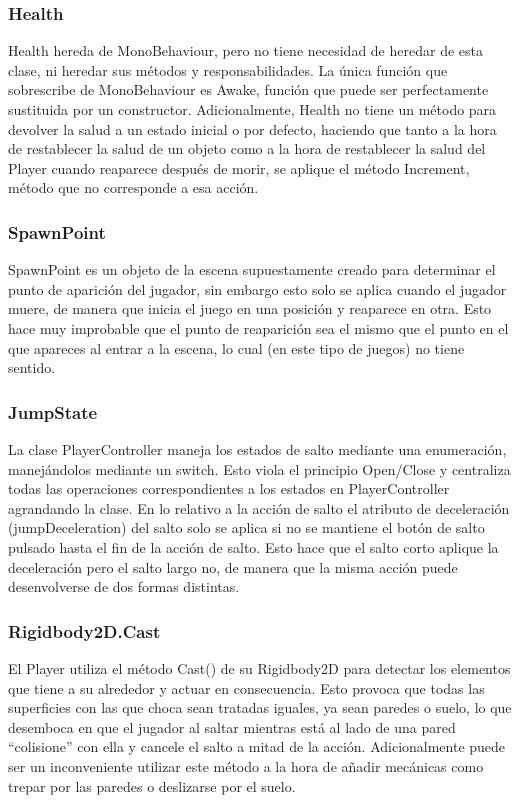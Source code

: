\subsubsection{Health}
Health hereda de MonoBehaviour, pero no tiene necesidad de heredar de esta clase, ni heredar sus métodos y responsabilidades. La única función que sobrescribe de MonoBehaviour es Awake, función que puede ser perfectamente sustituida por un constructor. Adicionalmente, Health no tiene un método para devolver la salud a un estado inicial o por defecto, haciendo que tanto a la hora de restablecer la salud de un objeto como a la hora de restablecer la salud del Player cuando reaparece después de morir, se aplique el método Increment, método que no corresponde a esa acción.

\subsubsection{SpawnPoint}
SpawnPoint es un objeto de la escena supuestamente creado para determinar el punto de aparición del jugador, sin embargo esto solo se aplica cuando el jugador muere, de manera que inicia el juego en una posición y reaparece en otra. Esto hace muy improbable que el punto de reaparición sea el mismo que el punto en el que apareces al entrar a la escena, lo cual (en este tipo de juegos) no tiene sentido.

\subsubsection{JumpState}
La clase PlayerController maneja los estados de salto mediante una enumeración, manejándolos mediante un switch. Esto viola el principio Open/Close y centraliza todas las operaciones correspondientes a los estados en PlayerController agrandando la clase. 
En lo relativo a la acción de salto el atributo de deceleración (jumpDeceleration) del salto solo se aplica si no se mantiene el botón de salto pulsado hasta el fin de la acción de salto. Esto hace que el salto corto aplique la deceleración pero el salto largo no, de manera que la misma acción puede desenvolverse de dos formas distintas. 

\subsubsection{Rigidbody2D.Cast}
El Player utiliza el método Cast() de su Rigidbody2D para detectar los elementos que tiene a su alrededor y actuar en consecuencia. Esto provoca que todas las superficies con las que choca sean tratadas iguales, ya sean paredes o suelo, lo que desemboca en que el jugador al saltar mientras está al lado de una pared “colisione” con ella y cancele el salto a mitad de la acción. Adicionalmente puede ser un inconveniente utilizar este método a la hora de añadir mecánicas como trepar por las paredes o deslizarse por el suelo. 


